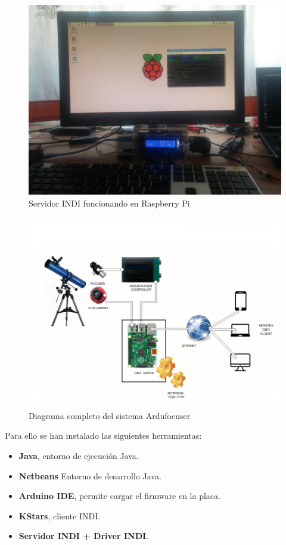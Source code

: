 \begin{figure}[h]
\centering
\includegraphics[width=1\linewidth]{../images/rasp_server}
\caption[Servidor INDI funcionando en Raspberry Pi]{Servidor INDI funcionando en Raspberry Pi}
\label{fig:raspberry}
\end{figure}

\begin{figure}
\centering
\includegraphics[width=1\linewidth]{../images/diagramaGeneral}
\caption[Diagrama completo del sistema Ardufocuser]{Diagrama completo del sistema Ardufocuser}
\label{fig:diagramaGeneral}
\end{figure}


Para ello se han instalado las siguientes herramientas:
\begin{itemize}
	\item \textbf{Java}, entorno de ejecución Java.
	\item \textbf{Netbeans} Entorno de desarrollo Java.
	\item \textbf{Arduino IDE}, permite cargar el firmware en la placa.
	\item \textbf{KStars}, cliente INDI.
	\item \textbf{Servidor INDI + Driver INDI}.
\end{itemize}

